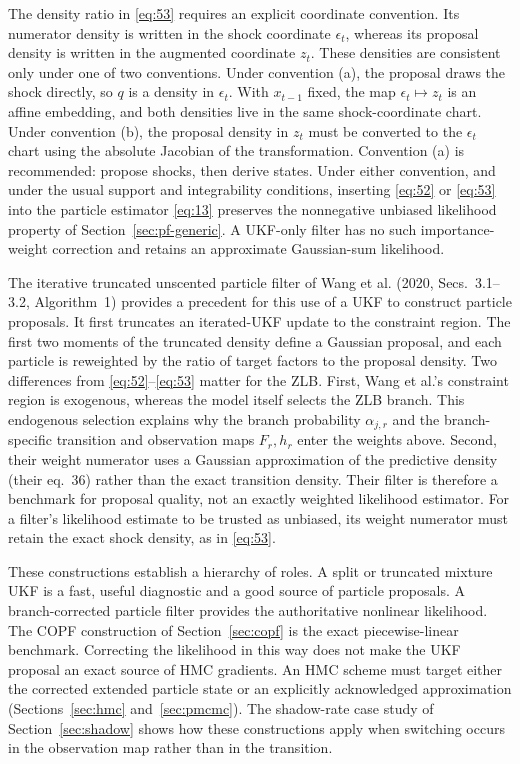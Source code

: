 \documentclass[11pt]{article}
\begin{document}
The density ratio in \eqref{eq:53} requires an explicit coordinate convention. Its numerator density is written in the shock coordinate $\epsilon_t$, whereas its proposal density is written in the augmented coordinate $z_t$. These densities are consistent only under one of two conventions. Under convention (a), the proposal draws the shock directly, so $q$ is a density in $\epsilon_t$. With $x_{t-1}$ fixed, the map $\epsilon_t\mapsto z_t$ is an affine embedding, and both densities live in the same shock-coordinate chart. Under convention (b), the proposal density in $z_t$ must be converted to the $\epsilon_t$ chart using the absolute Jacobian of the transformation. Convention (a) is recommended: propose shocks, then derive states. Under either convention, and under the usual support and integrability conditions, inserting \eqref{eq:52} or \eqref{eq:53} into the particle estimator \eqref{eq:13} preserves the nonnegative unbiased likelihood property of Section~\ref{sec:pf-generic}. A UKF-only filter has no such importance-weight correction and retains an approximate Gaussian-sum likelihood.

The iterative truncated unscented particle filter of Wang et al. (2020, Secs.~3.1--3.2, Algorithm~1) provides a precedent for this use of a UKF to construct particle proposals. It first truncates an iterated-UKF update to the constraint region. The first two moments of the truncated density define a Gaussian proposal, and each particle is reweighted by the ratio of target factors to the proposal density. Two differences from \eqref{eq:52}--\eqref{eq:53} matter for the ZLB. First, Wang et al.'s constraint region is exogenous, whereas the model itself selects the ZLB branch. This endogenous selection explains why the branch probability $\alpha_{j,r}$ and the branch-specific transition and observation maps $F_r,h_r$ enter the weights above. Second, their weight numerator uses a Gaussian approximation of the predictive density (their eq.~36) rather than the exact transition density. Their filter is therefore a benchmark for proposal quality, not an exactly weighted likelihood estimator. For a filter's likelihood estimate to be trusted as unbiased, its weight numerator must retain the exact shock density, as in \eqref{eq:53}.

These constructions establish a hierarchy of roles. A split or truncated mixture UKF is a fast, useful diagnostic and a good source of particle proposals. A branch-corrected particle filter provides the authoritative nonlinear likelihood. The COPF construction of Section~\ref{sec:copf} is the exact piecewise-linear benchmark. Correcting the likelihood in this way does not make the UKF proposal an exact source of HMC gradients. An HMC scheme must target either the corrected extended particle state or an explicitly acknowledged approximation (Sections~\ref{sec:hmc} and~\ref{sec:pmcmc}). The shadow-rate case study of Section~\ref{sec:shadow} shows how these constructions apply when switching occurs in the observation map rather than in the transition.
\end{document}
